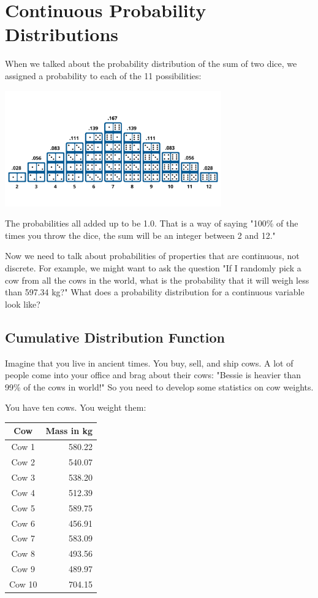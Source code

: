 \chapter{Continuous Probability Distributions}

When we talked about the probability distribution of the sum of two dice,  we assigned a probability to each of the 11 possibilities:

\includegraphics[width=0.7\textwidth]{dice_histogram.png}

The probabilities all added up to be 1.0.  That is a way of saying "100\% of the times you throw the dice,  the sum will be an integer between 2 and 12."

Now we need to talk about probabilities of properties that are continuous,  not discrete.   For example, we might want to ask the question "If I randomly pick a cow from all the cows in the 
world, what is the probability that it will weigh less than 597.34 kg?"  What does a probability distribution for a continuous variable look like?

\section{Cumulative Distribution Function}

Imagine that you live in ancient times.  You buy, sell, and ship cows.   A lot of people come into your office and brag about their cows: "Bessie is heavier than 99\% of the cows in 
world!"  So you need to develop some statistics on cow weights.

You have ten cows.  You weight them:

\begin{tabular}{c|r}
Cow & Mass in kg \\
\hline
Cow 1 & 580.22 \\
Cow 2 & 540.07 \\
Cow 3 & 538.20 \\
Cow 4 & 512.39 \\
Cow 5 & 589.75 \\
Cow 6 & 456.91 \\
Cow 7 & 583.09 \\
Cow 8 & 493.56 \\
Cow 9 & 489.97 \\
Cow 10 & 704.15 \\
\end{tabular}

